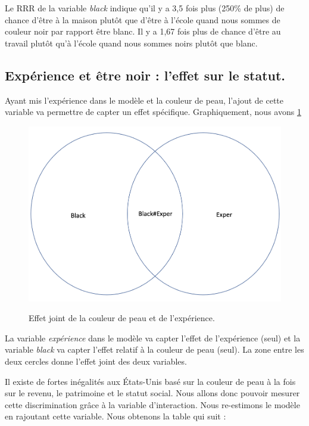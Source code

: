 \vspace*{0.3cm}

Le RRR de la variable \emph{black} indique qu’il y a 3,5 fois plus (250\% de plus) de chance d’être à la maison plutôt que d’être à l’école quand nous sommes de couleur noir par rapport être blanc. Il y a 1,67 fois plus de chance d’être au travail plutôt qu’à l’école quand nous sommes noirs plutôt que blanc.



\subsection{Expérience et être noir : l'effet sur le statut.}

Ayant mis l’expérience dans le modèle et la couleur de peau, l’ajout de cette variable va permettre de capter un effet spécifique. Graphiquement, nous avons \ref{fig:effetjoint}

\begin{figure}[h]
    \caption{Effet joint de la couleur de peau et de l'expérience.}
    \includegraphics[scale = 0.5]{101_graphics/effetjoint.png}
    \centering
    \label{fig:effetjoint}
\end{figure}

La variable \emph{expérience} dans le modèle va capter l’effet de l’expérience (seul) et la variable \emph{black} va capter l’effet relatif à la couleur de peau (seul). La zone entre les deux cercles donne l’effet joint des deux variables. 

\vspace*{0.3cm}

Il existe de fortes inégalités aux États-Unis basé sur la couleur de peau à la fois sur le revenu, le patrimoine et le statut social. Nous allons donc pouvoir mesurer cette discrimination grâce à la variable d’interaction. Nous re-estimons le modèle en rajoutant cette variable. Nous obtenons la table qui suit : 

